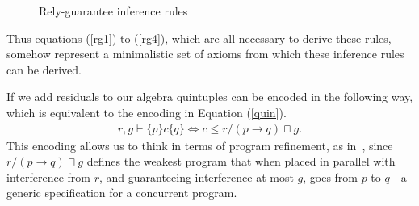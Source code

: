 \documentclass{llncs}
\begin{document}
\begin{figure}[hbt]
\centering
\begin{prooftree}
\end{prooftree}

\begin{prooftree}
\end{prooftree}

\begin{prooftree}
\end{prooftree}

\begin{prooftree}
\end{prooftree}

\begin{prooftree}
\end{prooftree}

\begin{prooftree}
\end{prooftree}
\caption{Rely-guarantee inference rules}
\label{fig:rgrules}
\end{figure}

Thus equations
(\ref{rg1}) to (\ref{rg4}), which are all necessary to derive these
rules, somehow represent a minimalistic set of axioms from which these
inference rules can be derived.

If we add residuals to our algebra quintuples can be encoded in the
following way, which is equivalent to the encoding in Equation
(\ref{quin}).
\begin{align}
r, g \vdash \{p\} c \{q\} \iff c \le r/(p \rightarrow q) \sqcap g \label{refine}.
\end{align}
This encoding allows us to think in terms of program refinement, as in~\cite{hayes_refining_2013}, since
$r/(p \rightarrow q) \sqcap g$ defines the weakest program that when
placed in parallel with interference from $r$, and guaranteeing
interference at most $g$, goes from $p$ to $q$---a generic
specification for a concurrent program.
\end{document}
